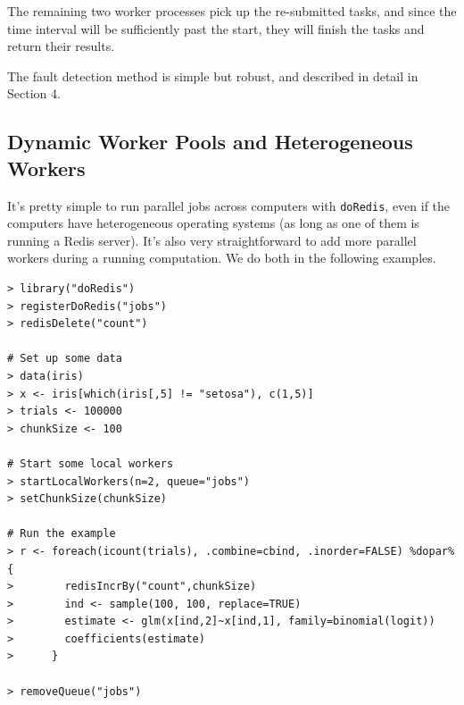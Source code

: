 \documentclass[12pt]{article}
\begin{document}
The remaining two worker processes pick up the re-submitted tasks, and since
the time interval will be sufficiently past the start, they will finish the
tasks and return their results.

The fault detection method is simple but robust, and described in detail
in Section 4.


\subsection{Dynamic Worker Pools and Heterogeneous Workers}

It's pretty simple to run parallel jobs across computers with {\tt doRedis},
even if the computers have heterogeneous operating systems (as long as one
of them is running a Redis server). It's also very straightforward to add
more parallel workers during a running computation. We do both in the following
examples.

\begin{lstlisting}[float=ht,caption=Simple Bootstrapping Example,label=bootstrapexample]
> library("doRedis")
> registerDoRedis("jobs")
> redisDelete("count")

# Set up some data
> data(iris)
> x <- iris[which(iris[,5] != "setosa"), c(1,5)]
> trials <- 100000
> chunkSize <- 100

# Start some local workers
> startLocalWorkers(n=2, queue="jobs")
> setChunkSize(chunkSize)

# Run the example
> r <- foreach(icount(trials), .combine=cbind, .inorder=FALSE) %dopar% {
>        redisIncrBy("count",chunkSize)
>        ind <- sample(100, 100, replace=TRUE)
>        estimate <- glm(x[ind,2]~x[ind,1], family=binomial(logit))
>        coefficients(estimate)
>      }

> removeQueue("jobs")
\end{lstlisting}
\end{document}

